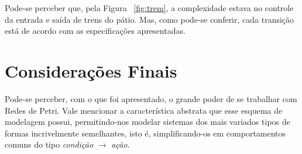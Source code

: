 \documentclass[a4paper,12pt]{article}
\begin{document}
Pode-se perceber que, pela Figura ~\ref{fig:trem}, a complexidade estava no controle da entrada e saída de trens do pátio. Mas, como pode-se conferir, cada transição está de acordo com as especificações apresentadas.

\section{Considerações Finais}

Pode-se perceber, com o que foi apresentado, o grande poder de se trabalhar com Redes de Petri. Vale mencionar a característica abstrata que esse esquema de modelagem possui, permitindo-nos modelar sistemas dos mais variados tipos de formas incrivelmente semelhantes, isto é, simplificando-os em comportamentos comuns do tipo \textit{condição} $\longrightarrow$ \textit{ação}.

{}



\end{document}
